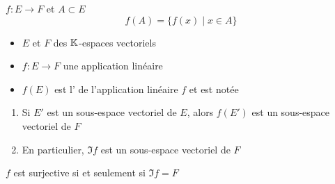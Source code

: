 \begin{frame}


 $f : E \longrightarrow F$ et $A \subset E$
$$f(A)=\big\{ f(x)  \mid x\in A \big\}$$

\pause
\bigskip

\begin{itemize}
  \item $E$ et $F$ des $\mathbb{K}$-espaces vectoriels
  \item $f : E \to F$ une application linéaire
  \item $f(E)$ est l' de l'application linéaire $f$ et est notée 
\end{itemize}

\pause

\begin{proposition}
\begin{enumerate}
  \item Si $E'$ est un sous-espace vectoriel de $E$, 
  alors $f(E')$ est un sous-espace vectoriel de $F$

  \pause
  
  \item En particulier, $\Im f$ est un sous-espace vectoriel de $F$
\end{enumerate}
 \end{proposition}

\pause
 
\centerline{$f$ est surjective si et seulement si $\Im f =F$}

\end{frame}


